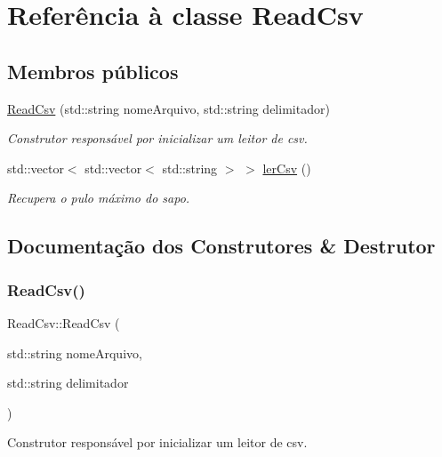 \hypertarget{classReadCsv}{}\section{Referência à classe Read\+Csv}
\label{classReadCsv}
\subsection*{Membros públicos}
\begin{DoxyCompactItemize}
\item 
\hyperlink{classReadCsv_af6d00a8833e6fd4996eb7d061f0f1fcf}{Read\+Csv} (std\+::string nome\+Arquivo, std\+::string delimitador)
\begin{DoxyCompactList}\small\item\em Construtor responsável por inicializar um leitor de csv. \end{DoxyCompactList}\item 
std\+::vector$<$ std\+::vector$<$ std\+::string $>$ $>$ \hyperlink{classReadCsv_a15d5143be99ff85bcf997617d0650f1c}{ler\+Csv} ()
\begin{DoxyCompactList}\small\item\em Recupera o pulo máximo do sapo. \end{DoxyCompactList}\end{DoxyCompactItemize}


\subsection{Documentação dos Construtores \& Destrutor}
\mbox{\label{classReadCsv_af6d00a8833e6fd4996eb7d061f0f1fcf}} 
\subsubsection{\texorpdfstring{Read\+Csv()}{ReadCsv()}}
{\footnotesize\ttfamily Read\+Csv\+::\+Read\+Csv (\begin{DoxyParamCaption}\item[{std\+::string}]{nome\+Arquivo,  }\item[{std\+::string}]{delimitador }\end{DoxyParamCaption})}



Construtor responsável por inicializar um leitor de csv. 


